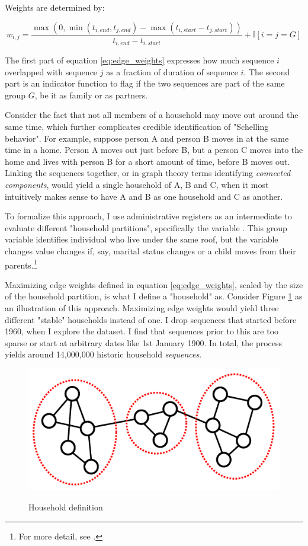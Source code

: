 \documentclass[main.tex]{subfiles}
\begin{document}
Weights are determined by:

\begin{equation}
    w_{i, j} = \frac{\max(0 , \min(t_{i,end}, t_{j, end}) -\max(t_{i,start}-t_{j, start}))}{t_{i,end}-t_{i,start}} + \mathbb{I}[i=j=G]
    \label{eq:edge_weights}
\end{equation}

The first part of equation \ref{eq:edge_weights} expresses how much sequence $i$ overlapped with sequence $j$ as a fraction of duration of sequence $i$. The second part is an indicator function to flag if the two sequences are part of the same group $G$, be it as family or as partners.

Consider the fact that not all members of a household may move out around the same time, which further complicates credible identification of "Schelling behavior". For example, suppose person A and person B moves in at the same time in a home. Person A moves out just before B, but a person C moves into the home and lives with person B for a short amount of time, before B moves out. Linking the sequences together, or in graph theory terms identifying \textit{connected components}, would yield a single household of A, B and C, when it most intuitively makes sense to have A and B as one household and C as another. 

To formalize this approach, I use administrative registers as an intermediate to evaluate different "household partitions", specifically the variable . This group variable identifies individual who live under the same roof, but the variable changes value changes if, say, marital status changes or a child moves from their parents.\footnote{For more detail, see \textcite{dst_familie_id}.} 

Maximizing edge weights defined in equation \ref{eq:edge_weights}, scaled by the size of the household partition, is what I define a "household" as. Consider Figure \ref{fig:temporal_community_detection} as an illustration of this approach. Maximizing edge weights would yield three different "stable" households instead of one. I drop sequences that started before 1960, when I explore the  dataset. I find that sequences prior to this are too sparse or start at arbitrary dates like 1st January 1900. In total, the process yields around 14,000,000 historic household \textit{sequences}. 
\begin{figure}[H]
    \centering
    \caption{Household definition}
    \includegraphics[width=0.7\linewidth]{figs/temporal_community_detection.png}
    \label{fig:temporal_community_detection}
\end{figure}
\end{document}
